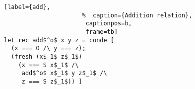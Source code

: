 \begin{figure}[!t]
  \centering
  \begin{minipage}{\columnwidth}
    \begin{lstlisting}[label={add},
                      %  caption={Addition relation},
                       captionpos=b,
                       frame=tb]
let rec add$^o$ x y z = conde [
  (x === O /\ y === z);
  (fresh (x$_1$ z$_1$)
    (x === S x$_1$ /\
     add$^o$ x$_1$ y z$_1$ /\
     z === S z$_1$)) ]
    \end{lstlisting}
  \end{minipage}
\end{figure}